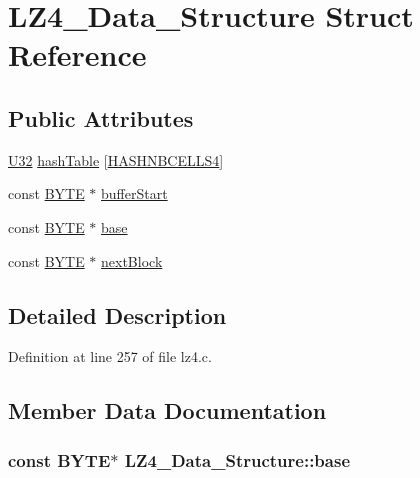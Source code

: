 \hypertarget{struct_l_z4___data___structure}{}\section{L\+Z4\+\_\+\+Data\+\_\+\+Structure Struct Reference}
\label{struct_l_z4___data___structure}
\subsection*{Public Attributes}
\begin{DoxyCompactItemize}
\item 
\hyperlink{lz4_8c_ac3df7cf3c8cb172a588adec881447d68}{U32} \hyperlink{struct_l_z4___data___structure_a619a192c8d9e8dc479fd8df09106e0bf}{hash\+Table} \mbox{[}\hyperlink{lz4_8c_a01c821754d4c7a78283f423ebd753071}{H\+A\+S\+H\+N\+B\+C\+E\+L\+L\+S4}\mbox{]}
\item 
const \hyperlink{lz4_8c_a4ae1dab0fb4b072a66584546209e7d58}{B\+Y\+T\+E} $\ast$ \hyperlink{struct_l_z4___data___structure_a3cfd405b97b4998b89dd9fad44e14714}{buffer\+Start}
\item 
const \hyperlink{lz4_8c_a4ae1dab0fb4b072a66584546209e7d58}{B\+Y\+T\+E} $\ast$ \hyperlink{struct_l_z4___data___structure_ab80b5080c12714a3f24864f899ea139f}{base}
\item 
const \hyperlink{lz4_8c_a4ae1dab0fb4b072a66584546209e7d58}{B\+Y\+T\+E} $\ast$ \hyperlink{struct_l_z4___data___structure_a7e7e3cfaeae61371275c713ddff64b15}{next\+Block}
\end{DoxyCompactItemize}


\subsection{Detailed Description}


Definition at line 257 of file lz4.\+c.



\subsection{Member Data Documentation}
\hypertarget{struct_l_z4___data___structure_ab80b5080c12714a3f24864f899ea139f}{}
\subsubsection[{base}]{\setlength{\rightskip}{0pt plus 5cm}const {\bf B\+Y\+T\+E}$\ast$ L\+Z4\+\_\+\+Data\+\_\+\+Structure\+::base}\label{struct_l_z4___data___structure_ab80b5080c12714a3f24864f899ea139f}


